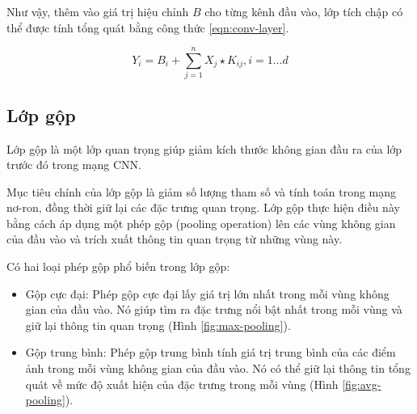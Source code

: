 Như vậy, thêm vào giá trị hiệu chỉnh $B$ cho từng kênh đầu vào, lớp tích chập có thể được tính tổng quát bằng công thức \ref{eqn:conv-layer}.

\begin{equation}\label{eqn:conv-layer}
	Y_i = B_i + \sum^n_{j=1}X_j \star K_{ij}, i = 1...d 
\end{equation}

\subsection{Lớp gộp}
Lớp gộp là một lớp quan trọng giúp giảm kích thước không gian đầu ra của lớp trước đó trong mạng CNN. 

Mục tiêu chính của lớp gộp là giảm số lượng tham số và tính toán trong mạng nơ-ron, đồng thời giữ lại các đặc trưng quan trọng. Lớp gộp thực hiện điều này bằng cách áp dụng một phép gộp (pooling operation) lên các vùng không gian của đầu vào và trích xuất thông tin quan trọng từ những vùng này.

Có hai loại phép gộp phổ biến trong lớp gộp:

\begin{itemize}
	\item Gộp cực đại: Phép gộp cực đại lấy giá trị lớn nhất trong mỗi vùng không gian của đầu vào. Nó giúp tìm ra đặc trưng nổi bật nhất trong mỗi vùng và giữ lại thông tin quan trọng (Hình \ref{fig:max-pooling}).
	\item Gộp trung bình: Phép gộp trung bình tính giá trị trung bình của các điểm ảnh trong mỗi vùng không gian của đầu vào. Nó có thể giữ lại thông tin tổng quát về mức độ xuất hiện của đặc trưng trong mỗi vùng (Hình \ref{fig:avg-pooling}).
\end{itemize}


